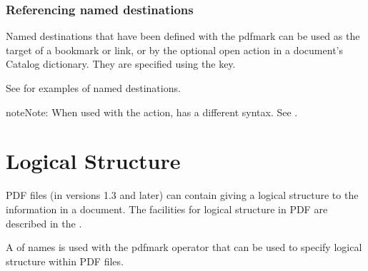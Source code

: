 \documentclass[letterpaper,12pt,english,openany,oneside]{sphinxmanual}
\begin{document}
\begin{sphinxVerbatim}[commandchars=\\\{\}]
\PYG{p}{[}  \PYG{p}{[}   \PYG{p}{]}
     \PYG{p}{[}   \PYG{p}{[} \PYG{p}{]}\PYG{p}{]}
     \PYG{p}{[}  \PYG{p}{]}
     
     
     
\end{sphinxVerbatim}


\subsection{Referencing named destinations}
\label{\detokenize{pdfmark_Actions:referencing-named-destinations}}
Named destinations that have been defined with the  pdfmark can be used as the target of a bookmark or link, or by the optional open action in a document’s Catalog dictionary. They are specified using the  key.

See  for examples of named destinations.

\begin{sphinxadmonition}{note}{Note:}
When used with the  action,  has a different syntax. See .
\end{sphinxadmonition}


\chapter{Logical Structure}
\label{\detokenize{pdfmark_Logical:logical-structure}}\label{\detokenize{pdfmark_Logical::doc}}
PDF files (in versions 1.3 and later) can contain  giving a logical structure to the information in a document. The facilities for logical structure in PDF are described in the  .

A  of names is used with the pdfmark operator that can be used to specify logical structure within PDF files.
\end{document}

